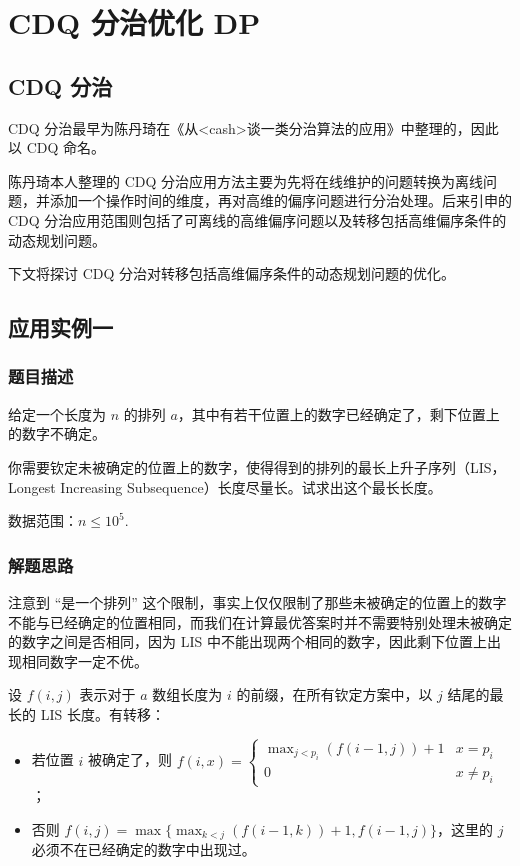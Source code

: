 
\chapter{CDQ 分治优化 DP}

\section{CDQ 分治}

CDQ
分治最早为陈丹琦在《从\textless cash\textgreater 谈一类分治算法的应用》中整理的，因此以
CDQ 命名。

陈丹琦本人整理的 CDQ
分治应用方法主要为先将在线维护的问题转换为离线问题，并添加一个操作时间的维度，再对高维的偏序问题进行分治处理。后来引申的
CDQ
分治应用范围则包括了可离线的高维偏序问题以及转移包括高维偏序条件的动态规划问题。

下文将探讨 CDQ 分治对转移包括高维偏序条件的动态规划问题的优化。

\section{应用实例一}

\subsection{题目描述}

给定一个长度为 \(n\) 的排列
\(a\)，其中有若干位置上的数字已经确定了，剩下位置上的数字不确定。

你需要钦定未被确定的位置上的数字，使得得到的排列的最长上升子序列（LIS，Longest
Increasing Subsequence）长度尽量长。试求出这个最长长度。

数据范围：\(n\leq 10^5\).

\subsection{解题思路}

注意到 ``是一个排列''
这个限制，事实上仅仅限制了那些未被确定的位置上的数字不能与已经确定的位置相同，而我们在计算最优答案时并不需要特别处理未被确定的数字之间是否相同，因为
LIS 中不能出现两个相同的数字，因此剩下位置上出现相同数字一定不优。

设 \(f(i,j)\) 表示对于 \(a\) 数组长度为 \(i\)
的前缀，在所有钦定方案中，以 \(j\) 结尾的最长的 LIS 长度。有转移：

\begin{itemize}
\item
  若位置 \(i\) 被确定了，则
  \(f(i,x)=\begin{cases}\max_{j < p_i}(f(i-1,j))+1&x=p_i\\0&x\not=p_i\end{cases}\)；
\item
  否则 \(f(i,j)=\max\{\max_{k < j}(f(i-1,k))+1,f(i-1,j)\}\)，这里的
  \(j\) 必须不在已经确定的数字中出现过。
\end{itemize}

